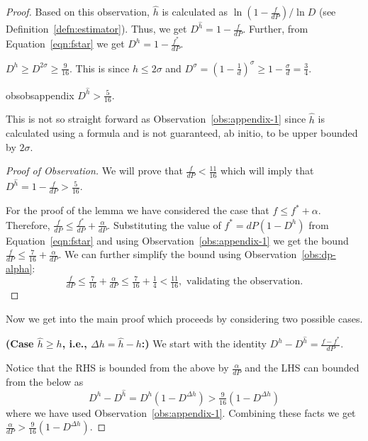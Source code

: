 \begin{proof}
    Based on this observation, $\hat{h}$ is calculated as $\ln\left( 1 - \tfrac{f}{dP} \right)/\ln D$ (see Definition~\ref{defn:estimator}). 
    Thus, we get $D^{\hat{h}} = 1 - \tfrac{f}{dP}$.
    Further, from Equation~\ref{eqn:fstar} we get $D^h = 1-\tfrac{f^*}{dP}$.
    

    \begin{obs}\label{obs:appendix-1} $D^h \ge D^{2\sigma} \ge \tfrac{9}{16}$. This is since $h \le 2\sigma$ and 
	$D^\sigma = (1-\tfrac{1}{d})^\sigma \ge 1 - \tfrac{\sigma}{d} =
	\tfrac{3}{4}$.
    \end{obs}

    \begin{restatable}{obs}{obsappendix}\label{obs:appendix-2}
	$D^{\hat{h}} > \tfrac{5}{16}$.
    \end{restatable}
	This is not so straight forward as
	Observation~\ref{obs:appendix-1} since $\hat{h}$ is calculated using a
	formula and is not guaranteed, ab initio, to be upper bounded by
	$2\sigma$.
	\begin{proof}[Proof of Observation]
	    We will prove that $\tfrac{f}{dP} < \tfrac{11}{16}$ which will imply that $D^{\hat{h}} = 1 - \tfrac{f}{dP} > \tfrac{5}{16}$.
	   
	    For the proof of the lemma we have considered the case that $f \le f^* + \alpha$. 
	    Therefore, $\tfrac{f}{dP} \le \tfrac{f^*}{dP} + \tfrac{\alpha}{dP}$.
	    Substituting the value of $f^*=dP(1-D^h)$ from Equation~\ref{eqn:fstar} and
	    using Observation~\ref{obs:appendix-1} we get the bound $\tfrac{f}{dP} \le
	    \tfrac{7}{16} + \tfrac{\alpha}{dP}$. We can further simplify the bound using Observation~\ref{obs:dp-alpha}:
    $$\tfrac{f}{dP} \le \tfrac{7}{16} + \tfrac{\alpha}{dP} \le \tfrac{7}{16} +
    \tfrac{1}{4} < \tfrac{11}{16}, \mbox{ validating the observation.}$$

	\end{proof}

    Now we get into the main proof which proceeds by considering two possible
    cases.
    
    {\bf (Case $\hat{h} \ge h$, i.e., $\Delta h=\hat{h}-h$:)} 
    We start with the identity $D^h - D^{\hat{h}} = \tfrac{f-f^*}{dP}$.

    Notice that the RHS is bounded from the above by $\tfrac{\alpha}{dP}$ and
    the LHS can bounded from the below as
    $$D^h - D^{\hat{h}} = D^h(1-D^{\Delta h}) > \tfrac{9}{16}(1-D^{\Delta h})$$
    where we have used Observation~\ref{obs:appendix-1}. Combining these facts
    we get $\tfrac{\alpha}{dP} > \tfrac{9}{16}(1-D^{\Delta h})$.


\end{proof}
